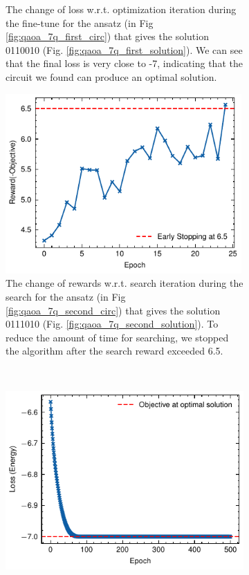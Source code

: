 \documentclass[a4paper,onecolumn,11pt]{quantumarticle}
\begin{document}
\begin{figure}[H]
\begin{subfigure}[t]{0.48\textwidth}
        \caption{The change of loss w.r.t. optimization iteration during the fine-tune for the ansatz (in Fig \ref{fig:qaoa_7q_first_circ}) that gives the solution 0110010 (Fig. \ref{fig:qaoa_7q_first_solution}). We can see that the final loss is very close to -7, indicating that the circuit we found can produce an optimal solution.}
        \label{fig:qaoa_finetune_1}
    \end{subfigure}
    \hfill
    \begin{subfigure}[b]{0.48\textwidth}
        \includegraphics[width=0.99\textwidth]{Figures/fig_qaoa_7q_2_search_rewards.pdf}
        \caption{The change of rewards w.r.t. search iteration during the search for the ansatz (in Fig \ref{fig:qaoa_7q_second_circ}) that gives the solution 0111010 (Fig. \ref{fig:qaoa_7q_second_solution}). To reduce the amount of time for searching, we stopped the algorithm after the search reward exceeded 6.5.}
        \label{fig:qaoa_search_reward_2}
    \end{subfigure}
    ~
    \begin{subfigure}[b]{0.48\textwidth}
        \includegraphics[width=\textwidth]{Figures/fig_qaoa_7q_2_fine_tune_loss.pdf}

\end{subfigure}
\end{figure}
\end{document}
